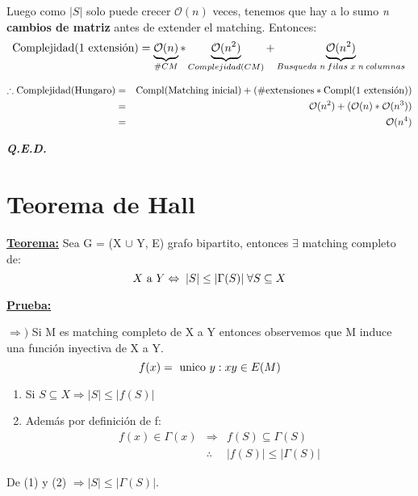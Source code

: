 \documentclass[12pt,a4paper]{report}
\newcommand{\QED}{\hfill \textit{\textbf{Q.E.D.}}}
\begin{document}
\begin{enumerate}
					\par Luego como $\lvert S \rvert$ solo puede crecer $\mathcal{O}(n)$ veces, tenemos que hay a lo sumo \textit{n} \textbf{cambios de matriz} antes de extender el matching. Entonces:
						\[
							\textup{Complejidad(1 extensión)} = \underbrace{\mathcal{O}(n)}_{\# CM} * \underbrace{\mathcal{O}(n^{2})}_{Complejidad(CM)} + \underbrace{\mathcal{O}(n^{2})}_{Busqueda \; \textit{n} \; filas \; x \; \textit{n} \; columnas } \\
						\]

					\vspace{5mm}
					\begin{eqnarray}
						\nonumber \therefore \textup{Complejidad(Hungaro)} &=& \textup{Compl(Matching inicial)} + (\# \textup{extensiones} * \textup{Compl(1 extensión)}) \\
						\nonumber &=& \mathcal{O}(n^{2}) + (\mathcal{O}(n) * \mathcal{O}(n^{3})) \\
						\nonumber &=& \mathcal{O}(n^{4})
					\end{eqnarray}
			\end{enumerate}

		\QED
	
	\section{Teorema de Hall}
		\textbf{\underline{Teorema:}} Sea G = (X $\cup$ Y, E) grafo bipartito, entonces $\exists$ matching completo de:
		\[
			X \textup{ a } Y \Leftrightarrow \; \lvert S \rvert \leq \lvert \Gamma(S) \rvert \; \forall S \subseteq X
		\]

		\vspace{3mm}
		\textbf{\underline{Prueba:}}
			\par $\Rightarrow)$ Si M es matching completo de X a Y entonces observemos que M induce una función inyectiva de X a Y.
			\[ f(x) = \textup{ unico } y : xy \in E(M) \]

			\begin{enumerate}
				\item Si $S \subseteq X \Rightarrow \lvert S \rvert \leq \lvert f(S) \rvert$
				\item Además por definición de f: 
					\begin{eqnarray}
						\nonumber f(x) \in \Gamma(x) &\Rightarrow & f(S) \subseteq \Gamma(S) \\
						\nonumber &\therefore & \lvert f(S) \rvert \leq \lvert \Gamma(S) \rvert
					\end{eqnarray}
			\end{enumerate}
			\par De (1) y (2) $\Rightarrow \lvert S \rvert \leq \lvert \Gamma(S) \rvert$.
\end{document}
